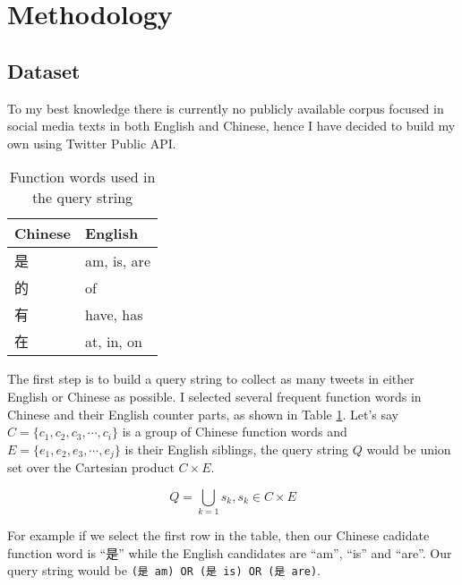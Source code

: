 \documentclass[11pt,a4paper]{article}
\begin{document}
\section{Methodology}\label{sec:method}

\subsection{Dataset}

To my best knowledge there is currently no publicly available corpus focused in social media texts in both English and Chinese, hence I have decided to build my own using Twitter Public API.

\begin{CJK*}{UTF8}{gbsn}

\begin{table}[t]
  \begin{center}
  \begin{tabular}{|l|l|}
  \hline \bf Chinese & \bf English \\ \hline
  是 & am, is, are \\
  的 & of \\
  有 & have, has \\
  在 & at, in, on \\
  \hline
  \end{tabular}
  \end{center}
  \caption{\label{tab:query-func-words-table} Function words used in the query string}
\end{table}

The first step is to build a query string to collect as many tweets in either English or Chinese as possible. I selected several frequent function words in Chinese and their English counter parts, as shown in Table \ref{tab:query-func-words-table}.  Let's say $C=\{c_1, c_2, c_3, \cdots, c_i\}$ is a group of Chinese function words and $E=\{e_1, e_2, e_3, \cdots, e_j\}$ is their English siblings, the query string $Q$ would be union set over the Cartesian product $C\times E$.

\begin{equation}
  Q=\bigcup_{k=1}s_k, s_k \in C \times E
\end{equation}

For example if we select the first row in the table, then our Chinese cadidate function word is ``是'' while the English candidates are ``am'', ``is'' and ``are''. Our query string would be \verb|(是 am) OR (是 is) OR (是 are)|.

\end{CJK*}
\end{document}
